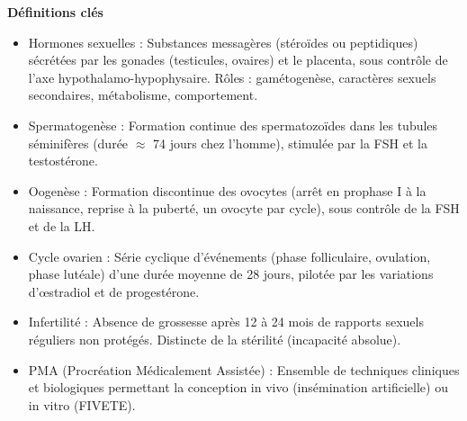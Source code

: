 \documentclass[11pt]{article}
\newcommand{\cle}[1]{{\popxbold\color{popdark}#1}}
\begin{document}
\begin{bilan}
\textbf{Définitions clés}
\begin{itemize}
    \item \cle{Hormones sexuelles} : Substances messagères (stéroïdes ou peptidiques) sécrétées par les gonades (testicules, ovaires) et le placenta, sous contrôle de l'axe hypothalamo-hypophysaire. Rôles : gamétogenèse, caractères sexuels secondaires, métabolisme, comportement.
    \item \cle{Spermatogenèse} : Formation continue des spermatozoïdes dans les tubules séminifères (durée $\approx$ 74 jours chez l'homme), stimulée par la FSH et la testostérone.
    \item \cle{Oogenèse} : Formation discontinue des ovocytes (arrêt en prophase I à la naissance, reprise à la puberté, un ovocyte par cycle), sous contrôle de la FSH et de la LH.
    \item \cle{Cycle ovarien} : Série cyclique d'événements (phase folliculaire, ovulation, phase lutéale) d'une durée moyenne de 28 jours, pilotée par les variations d'œstradiol et de progestérone.
    \item \cle{Infertilité} : Absence de grossesse après 12 à 24 mois de rapports sexuels réguliers non protégés. Distincte de la stérilité (incapacité absolue).
    \item \cle{PMA (Procréation Médicalement Assistée)} : Ensemble de techniques cliniques et biologiques permettant la conception in vivo (insémination artificielle) ou in vitro (FIVETE).
\end{itemize}


\end{bilan}
\end{document}
